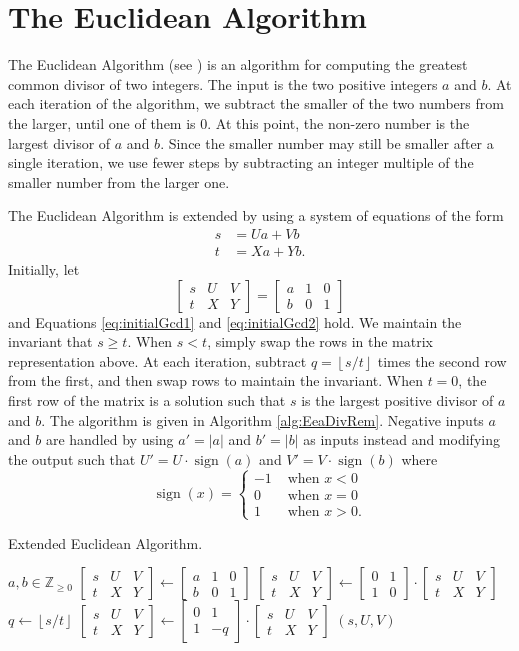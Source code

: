 \documentclass{ucalgthes1}
\theoremstyle{definition}
\DeclareMathOperator{\sign}{sign}
\newcommand{\ZZgez}{\mathbb{Z}_{\ge 0}}
\newcommand{\matrixtt}[4]{\left[ \begin{array}{rr} #1 & #2 \\ #3 & #4 \end{array} \right]}
\newcommand{\matrixThreeTwo}[6]{\left[ \begin{array}{rrr} #1 & #2 & #3 \\ #4 & #5 & #6 \end{array} \right]}
\newcommand{\floor}[1]{\left\lfloor #1 \right\rfloor}
\begin{document}
\section{The Euclidean Algorithm}
\label{sec:gcdEEA}

The Euclidean Algorithm (see \cite[\S 9.3.2]{Cohen2006}) is an algorithm for computing the greatest common divisor of two integers.  The input is the two positive integers $a$ and $b$.  At each iteration of the algorithm, we subtract the smaller of the two numbers from the larger, until one of them is 0. At this point, the non-zero number is the largest divisor of $a$ and $b$.  Since the smaller number may still be smaller after a single iteration, we use fewer steps by subtracting an integer multiple of the smaller number from the larger one.

The Euclidean Algorithm is extended by using a system of equations of the form
\begin{align}
s &= Ua + Vb \label{eq:initialGcd1} \\
t &= Xa + Yb. \label{eq:initialGcd2}
\end{align}
Initially, let
\[
\matrixThreeTwo{s}{U}{V}{t}{X}{Y} = \matrixThreeTwo{a}{1}{0}{b}{0}{1}
\]
and Equations \eqref{eq:initialGcd1} and \eqref{eq:initialGcd2} hold.  We maintain the invariant that $s \ge t$.  When $s < t$, simply swap the rows in the matrix representation above.  At each iteration, subtract $q = \floor{s/t}$ times the second row from the first, and then swap rows to maintain the invariant.  When $t=0$, the first row of the matrix is a solution such that $s$ is the largest positive divisor of $a$ and $b$.  The algorithm is given in Algorithm \ref{alg:EeaDivRem}.  Negative inputs $a$ and $b$ are handled by using $a' = |a|$ and $b' = |b|$ as inputs instead and modifying the output such that $U' = U \cdot \sign(a)$ and $V' = V \cdot \sign(b)$ where
\[
	\sign(x) = \begin{cases}
		-1 & \textrm{ when } x < 0 \\
		0 & \textrm{ when } x = 0 \\
		1 & \textrm{ when } x > 0.
	\end{cases}
\]

\begin{algorithm}[htb]
\caption{Extended Euclidean Algorithm.}
\label{alg:EeaDivRem}
\begin{algorithmic}[1]
\Require $a,b \in \ZZgez$
\State $\matrixThreeTwo{s}{U}{V}{t}{X}{Y} \gets 
        \matrixThreeTwo{a}{1}{0}{b}{0}{1}$
	\State $\matrixThreeTwo{s}{U}{V}{t}{X}{Y} \gets
	        \matrixtt{0}{1}{1}{0} \cdot \matrixThreeTwo{s}{U}{V}{t}{X}{Y}$
\EndIf
{}
	\State $q \gets \floor{s / t}$
	\State $\matrixThreeTwo{s}{U}{V}{t}{X}{Y} \gets \matrixtt{0}{1}{1}{-q} \cdot
		    \matrixThreeTwo{s}{U}{V}{t}{X}{Y}$ 
\EndWhile
\State \Return $(s, U, V)$ 
\end{algorithmic}
\end{algorithm}
\end{document}
